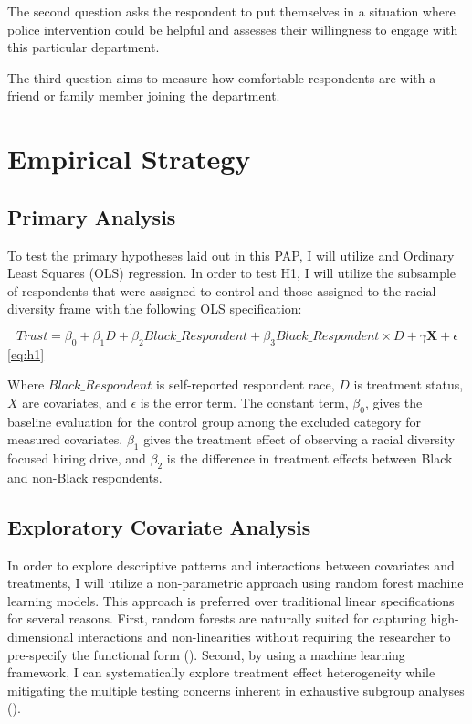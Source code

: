 \documentclass[12pt]{article}
\begin{document}
The second question asks the respondent to put themselves in a situation where police intervention could be helpful and assesses their willingness to engage with this particular department. 

The third question aims to measure how comfortable respondents are with a friend or family member joining the department. 

\section{Empirical Strategy}

\subsection{Primary Analysis}

To test the primary hypotheses laid out in this PAP, I will utilize and Ordinary Least Squares (OLS) regression. In order to test H1, I will utilize the subsample of respondents that were assigned to control and those assigned to the racial diversity frame with the following OLS specification:

\begin{equation}
    Trust = \beta_0 + \beta_1 D + \beta_2 Black\_Respondent +  \beta_3 Black\_Respondent\times D  + \gamma \mathbf{X} + \epsilon
\end{equation}\ref{eq:h1}

Where $Black\_Respondent$ is self-reported respondent race, $D$ is treatment status, $X$ are covariates, and $\epsilon$ is the error term. The constant term, $\beta_0$, gives the baseline evaluation for the control group among the excluded category for measured covariates. $\beta_1$ gives the treatment effect of observing a racial diversity focused hiring drive, and $\beta_2$ is the difference in treatment effects between Black and non-Black respondents.

\subsection{Exploratory Covariate Analysis}

In order to explore descriptive patterns and interactions between covariates and treatments, I will utilize a non-parametric approach using random forest machine learning models. This approach is preferred over traditional linear specifications for several reasons. First, random forests are naturally suited for capturing high-dimensional interactions and non-linearities without requiring the researcher to pre-specify the functional form (\cite{wager2018estimation}). Second, by using a machine learning framework, I can systematically explore treatment effect heterogeneity while mitigating the multiple testing concerns inherent in exhaustive subgroup analyses (\cite{imai2013estimating}).
\end{document}

